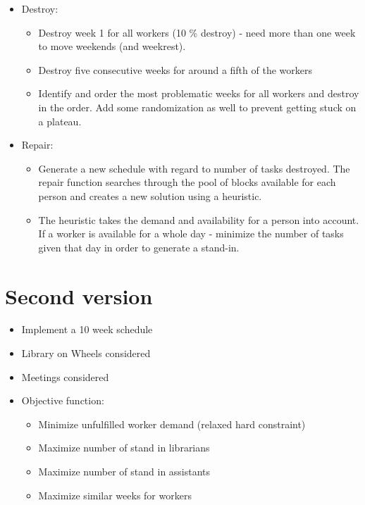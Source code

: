 \documentclass{article}
\begin{document}
\begin{itemize}
	\item Destroy:
		\begin{itemize}
		\item Destroy week 1 for all workers (10 \% destroy) - need more than one week to move weekends (and weekrest).
		\item Destroy five consecutive weeks for around a fifth of the workers
		\item Identify and order the most problematic weeks for all workers and destroy in the order. Add some randomization as well to prevent getting stuck on a plateau.
		\end{itemize}
	\item Repair:
		\begin{itemize}
		\item Generate a new schedule with regard to number of tasks destroyed. The repair function searches through the pool of blocks available for each person and creates a new solution using a heuristic.
		\item The heuristic takes the demand and availability for a person into account. If a worker is available for a whole day - minimize the number of tasks given that day in order to generate a stand-in. 
		\end{itemize}
	\end{itemize}
	\section*{Second version }
	\begin{itemize}
		\item Implement a 10 week schedule
		\item Library on Wheels considered
		\item Meetings considered
		\item Objective function:
				\begin{itemize}
				\item Minimize unfulfilled worker demand (relaxed hard constraint)
				\item Maximize number of stand in librarians
				\item Maximize number of stand in assistants
				\item Maximize similar weeks for workers
				\end{itemize}
				
	\end{itemize}
	
	
\end{document}
